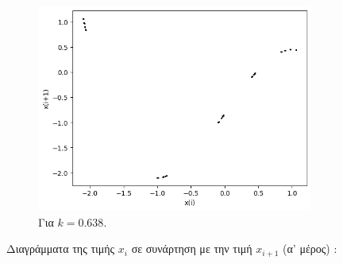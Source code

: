 \begin{figure}[h!]
\begin{subfigure}[b]{0.4\textwidth}
		\includegraphics[width=\textwidth]{LateX images/graphs q21/g8}
		\caption{Για $k=0.638$.}
		\label{f:k108}
	\end{subfigure}
	\hfill		
	\caption{Διαγράμματα της τιμής \(x_i\) σε συνάρτηση με την τιμή \(x_{i+1}\) (α' μέρος) :}
	\label{f:k244}
\end{figure}
